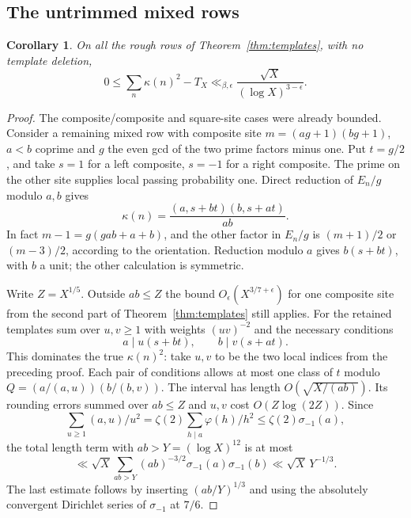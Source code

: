 \documentclass[11pt]{article}
\newtheorem{corollary}[theorem]{Corollary}
\begin{document}
\subsection{The untrimmed mixed rows}
\begin{corollary}\label{cor:mixed}
On all the rough rows of Theorem~\ref{thm:templates}, with no
template deletion,
\[
    0\le \sum_n\kappa(n)^2-T_X
       \ll_{\beta,\epsilon} \frac{\sqrt X}{(\log X)^{3-\epsilon}} .
\]
\end{corollary}
\begin{proof}
The composite/composite and square-site cases were already bounded.
Consider a remaining mixed row with composite site
\(m=(ag+1)(bg+1)\), \(a<b\) coprime and \(g\) the even gcd of the
two prime factors minus one. Put \(t=g/2\), and take \(s=1\) for a
left composite, \(s=-1\) for a right composite. The prime on the
other site supplies local passing probability one. Direct reduction
of \(E_n/g\) modulo \(a,b\) gives
\[
 \kappa(n)=\frac{(a,s+bt)(b,s+at)}{ab}.
\]
In fact \(m-1=g(gab+a+b)\), and the other factor in \(E_n/g\) is
\((m+1)/2\) or \((m-3)/2\), according to the orientation. Reduction
modulo \(a\) gives \(b(s+bt)\), with \(b\) a unit; the other
calculation is symmetric.

Write \(Z=X^{1/5}\). Outside \(ab\le Z\) the bound
\(O_\epsilon(X^{3/7+\epsilon})\) for one composite site from the
second part of Theorem~\ref{thm:templates} still applies.
For the retained templates sum over \(u,v\ge1\) with weights
\((uv)^{-2}\) and the necessary conditions
\[
 a\mid u(s+bt),\qquad b\mid v(s+at).
\]
This dominates the true \(\kappa(n)^2\): take \(u,v\) to be the two
local indices from the preceding proof. Each pair of conditions
allows at most one class of \(t\) modulo
\(Q=(a/(a,u))(b/(b,v))\). The interval has length
\(O(\sqrt{X/(ab)})\). Its rounding errors summed over \(ab\le Z\)
and \(u,v\) cost \(O(Z\log(2Z))\). Since
\[
 \sum_{u\ge1}(a,u)/u^2
 =\zeta(2)\sum_{h\mid a}\varphi(h)/h^2
 \le \zeta(2)\sigma_{-1}(a),
\]
the total length term with \(ab>Y=(\log X)^{12}\) is at most
\[
 \ll\sqrt X\sum_{ab>Y}(ab)^{-3/2}\sigma_{-1}(a)\sigma_{-1}(b)
 \ll\sqrt X\,Y^{-1/3}.
\]
The last estimate follows by inserting \((ab/Y)^{1/3}\) and
using the absolutely convergent Dirichlet series of \(\sigma_{-1}\)
at \(7/6\).


\end{proof}
\end{document}
